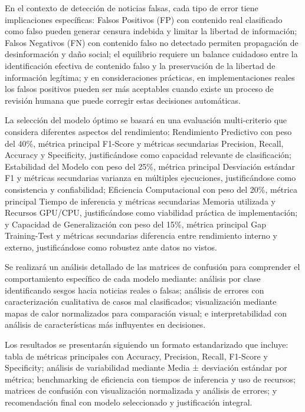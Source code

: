 En el contexto de detección de noticias falsas, cada tipo de error tiene implicaciones específicas: Falsos Positivos (FP) con contenido real clasificado como falso pueden generar censura indebida y limitar la libertad de información; Falsos Negativos (FN) con contenido falso no detectado permiten propagación de desinformación y daño social; el equilibrio requiere un balance cuidadoso entre la identificación efectiva de contenido falso y la preservación de la libertad de información legítima; y en consideraciones prácticas, en implementaciones reales los falsos positivos pueden ser más aceptables cuando existe un proceso de revisión humana que puede corregir estas decisiones automáticas.

La selección del modelo óptimo se basará en una evaluación multi-criterio que considera diferentes aspectos del rendimiento: Rendimiento Predictivo con peso del 40\%, métrica principal F1-Score y métricas secundarias Precision, Recall, Accuracy y Specificity, justificándose como capacidad relevante de clasificación; Estabilidad del Modelo con peso del 25\%, métrica principal Desviación estándar F1 y métricas secundarias varianza en múltiples ejecuciones, justificándose como consistencia y confiabilidad; Eficiencia Computacional con peso del 20\%, métrica principal Tiempo de inferencia y métricas secundarias Memoria utilizada y Recursos GPU/CPU, justificándose como viabilidad práctica de implementación; y Capacidad de Generalización con peso del 15\%, métrica principal Gap Training-Test y métricas secundarias diferencia entre rendimiento interno y externo, justificándose como robustez ante datos no vistos.

Se realizará un análisis detallado de las matrices de confusión para comprender el comportamiento específico de cada modelo mediante: análisis por clase identificando sesgos hacia noticias reales o falsas; análisis de errores con caracterización cualitativa de casos mal clasificados; visualización mediante mapas de calor normalizados para comparación visual; e interpretabilidad con análisis de características más influyentes en decisiones.

Los resultados se presentarán siguiendo un formato estandarizado que incluye: tabla de métricas principales con Accuracy, Precision, Recall, F1-Score y Specificity; análisis de variabilidad mediante Media ± desviación estándar por métrica; benchmarking de eficiencia con tiempos de inferencia y uso de recursos; matrices de confusión con visualización normalizada y análisis de errores; y recomendación final con modelo seleccionado y justificación integral.

